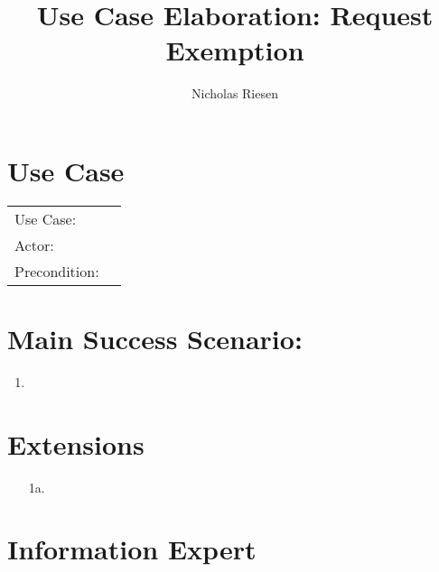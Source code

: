 \documentclass{article}
\title{Use Case Elaboration: Request Exemption}
\author{Nicholas Riesen}
\begin{document}
\maketitle

\section*{Use Case}
\begin{tabular}{l l}
  Use Case:     & \\
  Actor:        & \\
  Precondition: & \\
\end{tabular}

\section*{Main Success Scenario:}
\begin{enumerate}
  \item 
\end{enumerate}

\section*{Extensions}
\begin{itemize}
  \item [1a.]

\end{itemize}

\section*{Information Expert}
\end{document}
